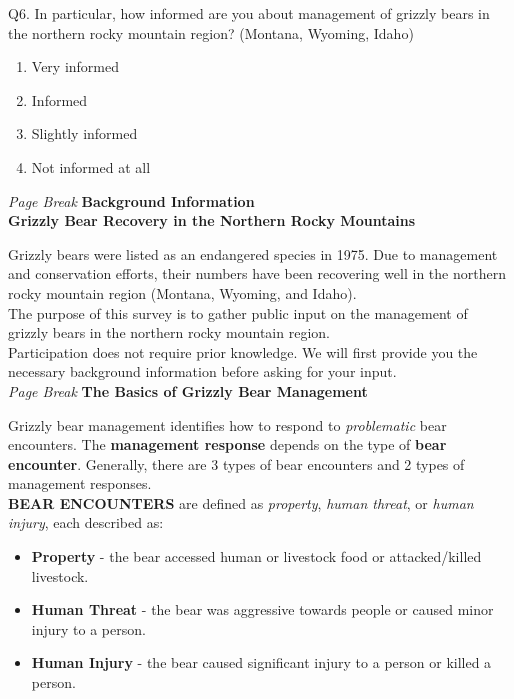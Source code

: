 \documentclass[english,12pt]{article}
\begin{document}
Q6. In particular, how informed are you about management of grizzly bears in the northern rocky mountain region? (Montana, Wyoming, Idaho)
\begin{enumerate}
    \item[a.] Very informed
    \item[b.] Informed
    \item[c.] Slightly informed
    \item[d.] Not informed at all
\end{enumerate}
\textit{Page Break}
\newpage
{\large\textbf{Background Information}}\\
\textbf{Grizzly Bear Recovery in the Northern Rocky Mountains}

Grizzly bears were listed as an endangered species in 1975. Due to management and conservation efforts, their numbers have been recovering well in the northern rocky mountain region (Montana, Wyoming, and Idaho).\\

The purpose of this survey is to gather public input on the management of grizzly bears in the northern rocky mountain region.\\

Participation does not require prior knowledge. We will first provide you the necessary background information before asking for your input.\\
\textit{Page Break}
\newpage
\textbf{The Basics of Grizzly Bear Management}

Grizzly bear management identifies how to respond to \textit{problematic} bear encounters. The \textbf{management response} depends on the type of \textbf{bear encounter}. Generally, there are 3 types of bear encounters and 2 types of management responses.\\

\textbf{BEAR ENCOUNTERS} are defined as \textit{property}, \textit{human threat}, or \textit{human injury}, each described as: 
\begin{itemize}
    \item \textbf{Property} - the bear accessed human or livestock food or attacked/killed livestock.
    \item \textbf{Human Threat} - the bear was aggressive towards people or caused minor injury to a person.
    \item \textbf{Human Injury} - the bear caused significant injury to a person or killed a person.
\end{itemize}
\end{document}
